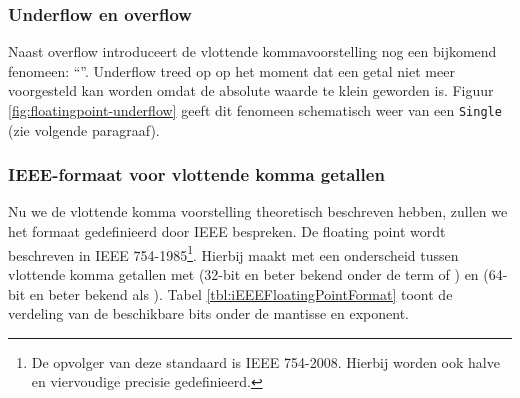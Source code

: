 \subsubsection{Underflow en overflow}
Naast overflow introduceert de vlottende kommavoorstelling nog een bijkomend fenomeen: ``''. Underflow treed op op het moment dat een getal niet meer voorgesteld kan worden omdat de absolute waarde te klein geworden is. Figuur \ref{fig:floatingpoint-underflow} geeft dit fenomeen schematisch weer van een \texttt{Single} (zie volgende paragraaf).
\subsubsection{IEEE-formaat voor vlottende komma getallen}
Nu we de vlottende komma voorstelling theoretisch beschreven hebben, zullen we het formaat gedefinieerd door IEEE bespreken. De floating point wordt beschreven in IEEE 754-1985\footnote{De opvolger van deze standaard is IEEE 754-2008\cite{5976968}. Hierbij worden ook halve en viervoudige precisie gedefinieerd.}\cite{30711}. Hierbij maakt met een onderscheid tussen vlottende komma getallen met  (32-bit en beter bekend onder de term  of ) en  (64-bit en beter bekend als ). Tabel \ref{tbl:iEEEFloatingPointFormat} toont de verdeling van de beschikbare bits onder de mantisse en exponent.
\begin{table}[hbt]
\centering
{}
\caption{IEEE 754-1985 Floating Point.}
\end{table}
